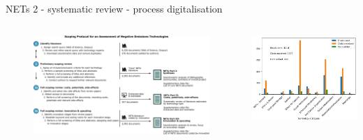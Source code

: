 \documentclass[9pt]{beamer}
\begin{document}
\begin{frame}{NETs 2 - systematic review - process digitalisation}

\begin{columns}
	\begin{column}{0.5\linewidth}
		\begin{figure}
			\includegraphics[width=\linewidth]{images/Fig3_scoping_protocol.png}
		\end{figure}
	\end{column}
	\begin{column}{0.5\linewidth}
		\includegraphics[width=\linewidth]{images/emails_responses.png}
	\end{column}
\end{columns}


\end{frame}
\end{document}

